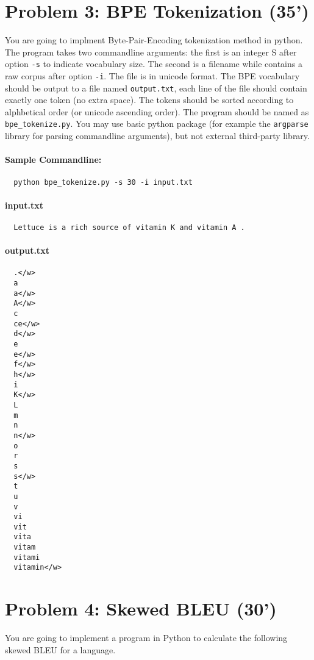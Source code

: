 \documentclass[12pt,letterpaper]{article}
\begin{document}
\section*{Problem 3: BPE Tokenization (35')} 
You are going to implment Byte-Pair-Encoding tokenization method in python.  
The program takes two commandline arguments: the first is an integer S after option \texttt{-s} to indicate vocabulary size. 
The second is a filename while contains a raw corpus after option \texttt{-i}. The file is in unicode format.  
The BPE vocabulary should be output to a file named \texttt{output.txt}, each line of the file should contain exactly one token (no extra space).
The tokens should be sorted according to alphbetical order (or unicode ascending order). 
The program should be named as \texttt{bpe\_tokenize.py}.
You may use basic python package (for example the \texttt{argparse} library for parsing commandline arguments), but not external third-party library.

\paragraph{Sample Commandline:}
\begin{verbatim}
  python bpe_tokenize.py -s 30 -i input.txt
\end{verbatim}

\paragraph{input.txt}
\begin{verbatim}
  Lettuce is a rich source of vitamin K and vitamin A .
\end{verbatim}

\paragraph{output.txt}
\begin{verbatim}
  .</w>
  a
  a</w>
  A</w>
  c
  ce</w>
  d</w>
  e
  e</w>
  f</w>
  h</w>
  i
  K</w>
  L
  m
  n
  n</w>
  o
  r
  s
  s</w>
  t
  u
  v
  vi
  vit
  vita
  vitam
  vitami
  vitamin</w>
\end{verbatim}

\section*{Problem 4: Skewed BLEU (30')} 
You are going to implement a program in Python to calculate the following skewed BLEU for a language.
\end{document}

